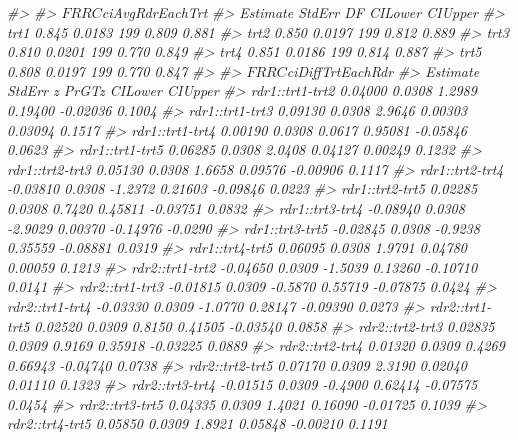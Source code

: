 \documentclass[
]{book}
\newenvironment{Shaded}{\begin{snugshade}}{\end{snugshade}}
\newcommand{\CommentTok}[1]{\textcolor[rgb]{0.56,0.35,0.01}{\textit{#1}}}
\begin{document}
\begin{Shaded}
\begin{Highlighting}[]
\CommentTok{\#\textgreater{} }
\CommentTok{\#\textgreater{} $FRRC$ciAvgRdrEachTrt}
\CommentTok{\#\textgreater{}      Estimate StdErr  DF CILower CIUpper}
\CommentTok{\#\textgreater{} trt1    0.845 0.0183 199   0.809   0.881}
\CommentTok{\#\textgreater{} trt2    0.850 0.0197 199   0.812   0.889}
\CommentTok{\#\textgreater{} trt3    0.810 0.0201 199   0.770   0.849}
\CommentTok{\#\textgreater{} trt4    0.851 0.0186 199   0.814   0.887}
\CommentTok{\#\textgreater{} trt5    0.808 0.0197 199   0.770   0.847}
\CommentTok{\#\textgreater{} }
\CommentTok{\#\textgreater{} $FRRC$ciDiffTrtEachRdr}
\CommentTok{\#\textgreater{}                 Estimate StdErr       z   PrGTz  CILower CIUpper}
\CommentTok{\#\textgreater{} rdr1::trt1{-}trt2  0.04000 0.0308  1.2989 0.19400 {-}0.02036  0.1004}
\CommentTok{\#\textgreater{} rdr1::trt1{-}trt3  0.09130 0.0308  2.9646 0.00303  0.03094  0.1517}
\CommentTok{\#\textgreater{} rdr1::trt1{-}trt4  0.00190 0.0308  0.0617 0.95081 {-}0.05846  0.0623}
\CommentTok{\#\textgreater{} rdr1::trt1{-}trt5  0.06285 0.0308  2.0408 0.04127  0.00249  0.1232}
\CommentTok{\#\textgreater{} rdr1::trt2{-}trt3  0.05130 0.0308  1.6658 0.09576 {-}0.00906  0.1117}
\CommentTok{\#\textgreater{} rdr1::trt2{-}trt4 {-}0.03810 0.0308 {-}1.2372 0.21603 {-}0.09846  0.0223}
\CommentTok{\#\textgreater{} rdr1::trt2{-}trt5  0.02285 0.0308  0.7420 0.45811 {-}0.03751  0.0832}
\CommentTok{\#\textgreater{} rdr1::trt3{-}trt4 {-}0.08940 0.0308 {-}2.9029 0.00370 {-}0.14976 {-}0.0290}
\CommentTok{\#\textgreater{} rdr1::trt3{-}trt5 {-}0.02845 0.0308 {-}0.9238 0.35559 {-}0.08881  0.0319}
\CommentTok{\#\textgreater{} rdr1::trt4{-}trt5  0.06095 0.0308  1.9791 0.04780  0.00059  0.1213}
\CommentTok{\#\textgreater{} rdr2::trt1{-}trt2 {-}0.04650 0.0309 {-}1.5039 0.13260 {-}0.10710  0.0141}
\CommentTok{\#\textgreater{} rdr2::trt1{-}trt3 {-}0.01815 0.0309 {-}0.5870 0.55719 {-}0.07875  0.0424}
\CommentTok{\#\textgreater{} rdr2::trt1{-}trt4 {-}0.03330 0.0309 {-}1.0770 0.28147 {-}0.09390  0.0273}
\CommentTok{\#\textgreater{} rdr2::trt1{-}trt5  0.02520 0.0309  0.8150 0.41505 {-}0.03540  0.0858}
\CommentTok{\#\textgreater{} rdr2::trt2{-}trt3  0.02835 0.0309  0.9169 0.35918 {-}0.03225  0.0889}
\CommentTok{\#\textgreater{} rdr2::trt2{-}trt4  0.01320 0.0309  0.4269 0.66943 {-}0.04740  0.0738}
\CommentTok{\#\textgreater{} rdr2::trt2{-}trt5  0.07170 0.0309  2.3190 0.02040  0.01110  0.1323}
\CommentTok{\#\textgreater{} rdr2::trt3{-}trt4 {-}0.01515 0.0309 {-}0.4900 0.62414 {-}0.07575  0.0454}
\CommentTok{\#\textgreater{} rdr2::trt3{-}trt5  0.04335 0.0309  1.4021 0.16090 {-}0.01725  0.1039}
\CommentTok{\#\textgreater{} rdr2::trt4{-}trt5  0.05850 0.0309  1.8921 0.05848 {-}0.00210  0.1191}

\end{Highlighting}
\end{Shaded}
\end{document}
